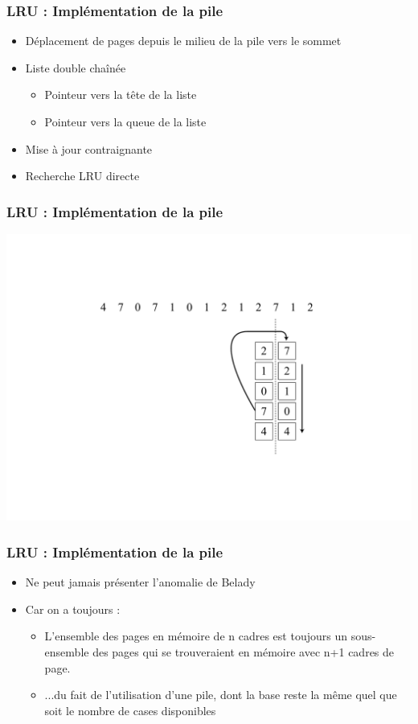 \begin{frame}
\frametitle{LRU : Implémentation de la pile}
\begin{itemize}
\item Déplacement de pages depuis le milieu de la pile vers le sommet
\item Liste double chaînée
\begin{itemize}
\item Pointeur vers la tête de la liste
\item Pointeur vers la queue de la liste
\end{itemize}
\item Mise à jour contraignante
\item Recherche LRU directe
\end{itemize}
\end{frame}


\begin{frame}
\frametitle{LRU : Implémentation de la pile}
\includegraphics[width=.8\textwidth]{../illustration/remplacement_lru_pile.pdf}
\end{frame}


\begin{frame}
\frametitle{LRU : Implémentation de la pile}
\begin{itemize}
\item Ne peut jamais présenter l'anomalie de Belady
\item Car on a toujours :
\begin{itemize}
\item L'ensemble des pages en mémoire de n cadres est toujours un sous-ensemble des pages qui se trouveraient en mémoire avec n+1 cadres de page.
\item ...du fait de l'utilisation d'une pile, dont la base reste la même quel que soit le nombre de cases disponibles
\end{itemize}
\end{itemize}
\end{frame}


